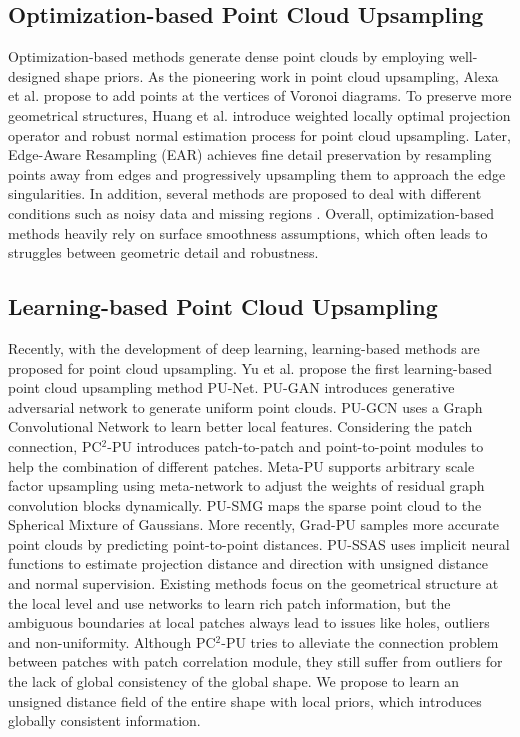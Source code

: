 \documentclass[letterpaper]{article} %
\begin{document}
\subsection{Optimization-based Point Cloud Upsampling}
Optimization-based methods generate dense point clouds by employing well-designed shape priors. As the pioneering work in point cloud upsampling, Alexa et al. \citeyear{alexa2003computing} propose to add points at the vertices of Voronoi diagrams. To preserve more geometrical structures, Huang et al. \citeyear{huang2009consolidation} introduce weighted locally optimal projection operator and robust normal estimation process for point cloud upsampling. Later, Edge-Aware Resampling (EAR) \cite{huang2013edge} achieves fine detail preservation by resampling points away from edges and progressively upsampling them to approach the edge singularities. In addition, several methods are proposed to deal with different conditions such as noisy data \cite{lipman2007parameterization} and missing regions \cite{wu2015deep}.
Overall, optimization-based methods heavily rely on surface smoothness assumptions, which often leads to struggles between geometric detail and robustness.
\subsection{Learning-based Point Cloud Upsampling}

Recently, with the development of deep learning, learning-based methods \cite{yu2018pu, qian2020pugeo, luo2021pu, liu2022spu, feng2022neural} are proposed for point cloud upsampling. Yu et al. \cite{yu2018pu} propose the first learning-based point cloud upsampling method PU-Net. PU-GAN \cite{li2019pu} introduces generative adversarial network \cite{goodfellow2014generative} to generate uniform point clouds. PU-GCN \cite{qian2021pu} uses a Graph Convolutional Network to learn better local features. Considering the patch connection, PC${^2}$-PU \cite{long2022pc2} introduces patch-to-patch and point-to-point modules to help the combination of different patches. Meta-PU \cite{ye2021meta} supports arbitrary scale factor upsampling using meta-network to adjust the weights of residual graph convolution blocks dynamically. PU-SMG \cite{dell2022arbitrary} maps the sparse point cloud to the Spherical Mixture of Gaussians. More recently, Grad-PU \cite{he2023grad} samples more accurate point clouds by predicting point-to-point distances. PU-SSAS \cite{zhao2023self} uses implicit neural functions to estimate projection distance and direction with unsigned distance and normal supervision. Existing methods focus on the geometrical structure at the local level and use networks to learn rich patch information, but the ambiguous boundaries at local patches always lead to issues like holes, outliers and non-uniformity. Although PC${^2}$-PU tries to alleviate the connection problem between patches with patch correlation module, they still suffer from outliers for the lack of global consistency of the global shape. We propose to learn an unsigned distance field of the entire shape with local priors, which introduces globally consistent information.
\end{document}
